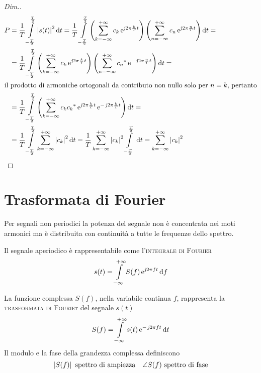 \begin{proof}[Dim.]
\[\begin{split}P&= \frac{1}{T}\intd{-\frac{T}{2}}{\frac{T}{2}}{\abs{s(t)}^2}{t}=\frac{1}{T}\intd{-\frac{T}{2}}{\frac{T}{2}}{ \left(\sum_{k=-\infty}^{+\infty}{c_k\e{\imath 2\pi\frac{k}{T}t}}\right) \left(\sum_{n=-\infty}^{+\infty}{c_n\e{\imath 2\pi\frac{n}{T}t}}\right)}{t}= \\
&=\frac{1}{T}\intd{-\frac{T}{2}}{\frac{T}{2}}{ \left(\sum_{k=-\infty}^{+\infty}{c_k\e{\imath 2\pi\frac{k}{T}t}}\right) \left(\sum_{n=-\infty}^{+\infty}{\conj{c_n}\e{-\imath 2\pi\frac{n}{T}t}}\right)}{t}= \\
\intertext{il prodotto di armoniche ortogonali da contributo non nullo solo per $n=k$, pertanto}
&=\frac{1}{T}\intd{-\frac{T}{2}}{\frac{T}{2}}{ \left(\sum_{k=-\infty}^{+\infty}{c_k \conj{c_k} \e{\imath 2\pi\frac{k}{T}t} \e{-\imath 2\pi\frac{k}{T}t}}\right)}{t}= \\
&=\frac{1}{T}\intd{-\frac{T}{2}}{\frac{T}{2}}{\sum_{k=-\infty}^{+\infty}{\abs{c_k}^2}}{t}=
\frac{1}{T}\sum_{k=-\infty}^{+\infty}{\abs{c_k}^2}\intd{-\frac{T}{2}}{\frac{T}{2}}{}{t}=\sum_{k=-\infty}^{+\infty}{\abs{c_k}^2}
\end{split}\]
\end{proof}

\section{Trasformata di Fourier}
Per segnali non periodici la potenza del segnale non è concentrata nei moti armonici ma è distribuita con continuità a tutte le frequenze dello spettro.

Il segnale aperiodico è rappresentabile come l'\textsc{integrale di Fourier}
\begin{equation}
s(t)=\int\limits_{-\infty}^{+\infty}{S(f)\operatorname{e}^{\operatorname{\mathit{j}\!} 2\pi f t}}{\,\mathop{}\!\mathrm{d}{f}}
\end{equation}

La funzione complessa $S(f)$, nella variabile continua $f$, rappresenta la \textsc{trasformata di Fourie}r del segnale $s(t)$
\begin{equation}
S(f)=\int\limits_{-\infty}^{+\infty}{s(t)\operatorname{e}^{-\operatorname{\mathit{j}\!} 2\pi f t}}{\,\mathop{}\!\mathrm{d}{t}}
\end{equation}
Il modulo e la fase della grandezza complessa definiscono
\[\left|{S(f)}\right| \text{ spettro di ampiezza} \quad \angle S(f) \text{ spettro di fase}\]

